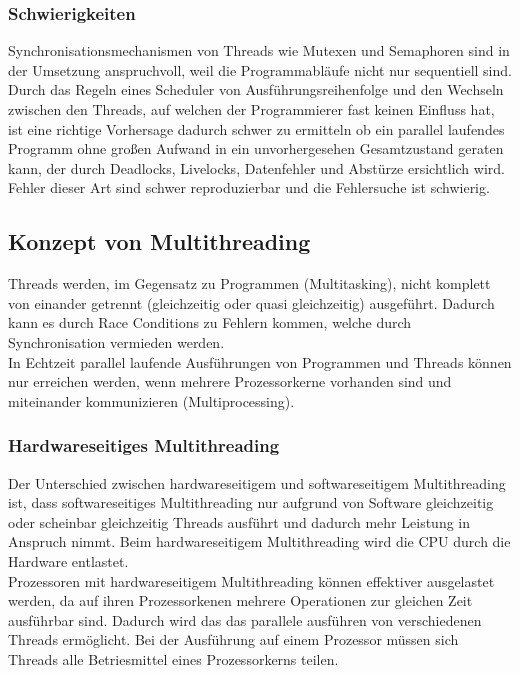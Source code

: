 \documentclass[12pt,a4paper]{report}
\begin{document}
\begin{onehalfspace}
\subsubsection{Schwierigkeiten}
Synchronisationsmechanismen von Threads wie Mutexen und Semaphoren sind in der Umsetzung anspruchvoll, weil die Programmabläufe nicht nur sequentiell sind. Durch das Regeln eines Scheduler von Ausführungsreihenfolge und den Wechseln zwischen den Threads, auf welchen der Programmierer fast keinen Einfluss hat, ist eine richtige Vorhersage dadurch schwer zu ermitteln ob ein parallel laufendes Programm ohne großen Aufwand in ein unvorhergesehen Gesamtzustand geraten kann, der durch Deadlocks, Livelocks, Datenfehler und Abstürze ersichtlich wird.\\
Fehler dieser Art sind schwer reproduzierbar und die Fehlersuche ist schwierig.


\subsection{Konzept von Multithreading}
Threads werden, im Gegensatz zu Programmen (Multitasking), nicht komplett von einander getrennt (gleichzeitig oder quasi gleichzeitig) ausgeführt. Dadurch kann es durch Race Conditions zu Fehlern kommen, welche durch Synchronisation vermieden werden.\\ 
In Echtzeit parallel laufende Ausführungen von Programmen und Threads können nur erreichen werden, wenn mehrere Prozessorkerne vorhanden sind und miteinander kommunizieren (Multiprocessing).

\subsubsection{Hardwareseitiges Multithreading}
Der Unterschied zwischen hardwareseitigem und softwareseitigem Multithreading ist, dass softwareseitiges Multithreading nur aufgrund von Software gleichzeitig oder scheinbar gleichzeitig Threads ausführt und dadurch mehr Leistung in Anspruch nimmt. Beim hardwareseitigem  Multithreading wird die CPU durch die Hardware entlastet.\\

Prozessoren mit hardwareseitigem Multithreading können effektiver ausgelastet werden, da auf ihren Prozessorkenen mehrere Operationen zur gleichen Zeit ausführbar sind. Dadurch wird das das parallele ausführen von verschiedenen Threads ermöglicht. Bei der Ausführung auf einem Prozessor müssen sich Threads alle Betriesmittel eines Prozessorkerns teilen.\\


\end{onehalfspace}
\end{document}
